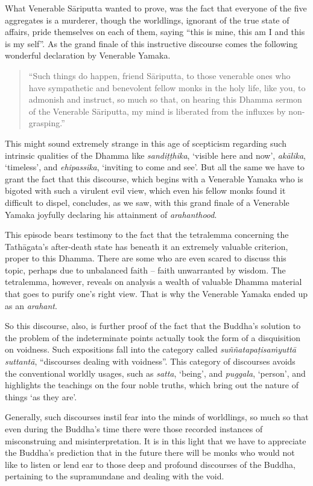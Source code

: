What Venerable Sāriputta wanted to prove, was the fact that everyone of the five aggregates is a murderer, though the worldlings, ignorant of the true state of affairs, pride themselves on each of them, saying ``this is mine, this am I and this is my self''. As the grand finale of this instructive discourse comes the following wonderful declaration by Venerable Yamaka.

\begin{quote}
``Such things do happen, friend Sāriputta, to those venerable ones who have sympathetic and benevolent fellow monks in the holy life, like you, to admonish and instruct, so much so that, on hearing this Dhamma sermon of the Venerable Sāriputta, my mind is liberated from the influxes by non-grasping.''
\end{quote}

This might sound extremely strange in this age of scepticism regarding such intrinsic qualities of the Dhamma like \emph{sandiṭṭhika}, `visible here and now', \emph{akālika}, `timeless', and \emph{ehipassika}, `inviting to come and see'. But all the same we have to grant the fact that this discourse, which begins with a Venerable Yamaka who is bigoted with such a virulent evil view, which even his fellow monks found it difficult to dispel, concludes, as we saw, with this grand finale of a Venerable Yamaka joyfully declaring his attainment of \emph{arahanthood}.

This episode bears testimony to the fact that the tetralemma concerning the Tathāgata's after-death state has beneath it an extremely valuable criterion, proper to this Dhamma. There are some who are even scared to discuss this topic, perhaps due to unbalanced faith -- faith unwarranted by wisdom. The tetralemma, however, reveals on analysis a wealth of valuable Dhamma material that goes to purify one's right view. That is why the Venerable Yamaka ended up as an \emph{arahant}.

So this discourse, also, is further proof of the fact that the Buddha's solution to the problem of the indeterminate points actually took the form of a disquisition on voidness. Such expositions fall into the category called \emph{suññatapaṭisaṁyuttā suttantā}, ``discourses dealing with voidness''. This category of discourses avoids the conventional worldly usages, such as \emph{satta}, `being', and \emph{puggala}, `person', and highlights the teachings on the four noble truths, which bring out the nature of things `as they are'.

Generally, such discourses instil fear into the minds of worldlings, so much so that even during the Buddha's time there were those recorded instances of misconstruing and misinterpretation. It is in this light that we have to appreciate the Buddha's prediction that in the future there will be monks who would not like to listen or lend ear to those deep and profound discourses of the Buddha, pertaining to the supramundane and dealing with the void.

